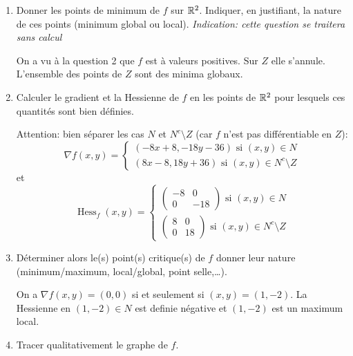 \documentclass[a4paper]{tp_um}
\begin{document}
\begin{enumerate}
	\item Donner les points de minimum de $f$ sur $\mathbb{R}^2$. Indiquer, en justifiant, la nature de ces points (minimum global ou local).
		\textit{Indication: cette question se traitera sans calcul}
	
                \bigskip
        On a vu à la question 2 que $f$ est à valeurs positives. Sur $Z$ elle s'annule. L'ensemble des points de $Z$ sont des minima globaux.
                \bigskip
	\item Calculer le gradient et la Hessienne de $f$ en les points de $\mathbb{R}^2$ pour lesquels ces quantités sont bien définies.
                \bigskip

        Attention: bien séparer les cas $N$ et $N^c\setminus Z$ (car $f$ n'est pas différentiable en $Z$):
        \[
                \nabla f(x,y) = \begin{cases}
                (-8x+8,-18y-36)  \text{ si $(x,y) \in N$}\\
                (8x-8,18y +36)	 \text{ si $(x,y) \in N^c\setminus Z$}
                \end{cases}
        \]
        et
        \[
                \operatorname{Hess}_f (x,y) = \begin{cases}
                        \begin{pmatrix}
                                 -8 & 0 \\ 0 & -18
                         \end{pmatrix} \text{ si $(x,y) \in N$}\\
                         \begin{pmatrix}
                                 8 & 0 \\ 0 & 18
                         \end{pmatrix}\text{ si $(x,y) \in N^c\setminus Z$}
                \end{cases}
        \]

                \bigskip

	\item Déterminer alors le(s) point(s) critique(s) de $f$ donner leur nature (minimum/maximum, local/global, point selle,\ldots).

                \bigskip
On a $\nabla f (x,y) = (0,0)$ si et seulement si $(x,y) =(1,-2)$. La Hessienne en $(1,-2)\in N$ est definie négative et $(1,-2) $ est un maximum local.
                \bigskip
        \item Tracer qualitativement le graphe de $f$.


\end{enumerate}
\end{document}
